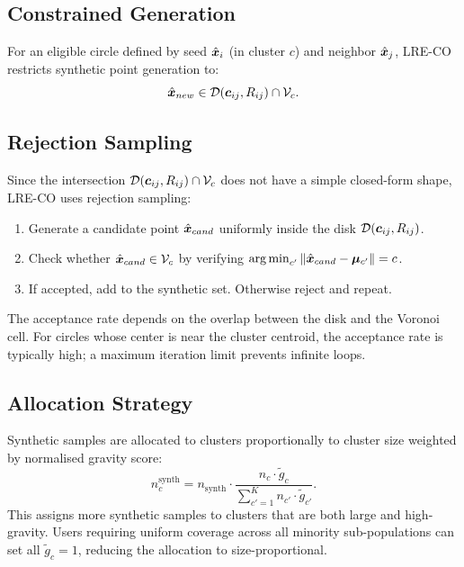 \subsection{Constrained Generation}

For an eligible circle defined by seed $\hat{\bm{x}}_i$ (in cluster $c$) and neighbor $\hat{\bm{x}}_j$, LRE-CO restricts synthetic point generation to:
\begin{equation}
    \hat{\bm{x}}_{new} \in \mathcal{D}(\bm{c}_{ij}, R_{ij}) \cap \mathcal{V}_c.
    \label{eq:lre_constraint}
\end{equation}

\subsection{Rejection Sampling}

Since the intersection $\mathcal{D}(\bm{c}_{ij}, R_{ij}) \cap \mathcal{V}_c$ does not have a simple closed-form shape, LRE-CO uses rejection sampling:
\begin{enumerate}[leftmargin=*]
    \item Generate a candidate point $\hat{\bm{x}}_{cand}$ uniformly inside the disk $\mathcal{D}(\bm{c}_{ij}, R_{ij})$.
    \item Check whether $\hat{\bm{x}}_{cand} \in \mathcal{V}_c$ by verifying $\operatorname*{arg\,min}_{c'} \|\hat{\bm{x}}_{cand} - \boldsymbol{\mu}_{c'}\| = c$.
    \item If accepted, add to the synthetic set. Otherwise reject and repeat.
\end{enumerate}
The acceptance rate depends on the overlap between the disk and the Voronoi cell.
For circles whose center is near the cluster centroid, the acceptance rate is typically high; a maximum iteration limit prevents infinite loops.

\subsection{Allocation Strategy}

Synthetic samples are allocated to clusters proportionally to cluster size weighted by normalised gravity score:
\begin{equation}
    n_c^{\text{synth}} = n_{\text{synth}} \cdot \frac{n_c \cdot \tilde{g}_c}{\sum_{c'=1}^{K} n_{c'} \cdot \tilde{g}_{c'}}.
    \label{eq:lre_allocation}
\end{equation}
This assigns more synthetic samples to clusters that are both large and high-gravity.
Users requiring uniform coverage across all minority sub-populations can set all $\tilde{g}_c = 1$, reducing the allocation to size-proportional.

